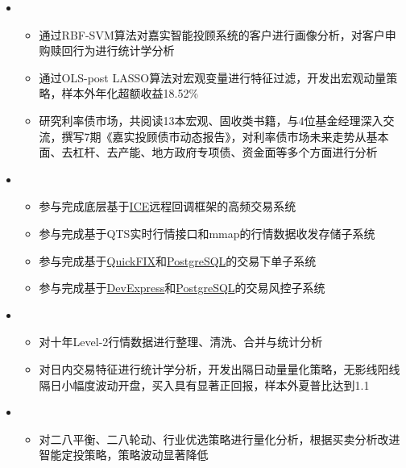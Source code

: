   \begin{itemize}[leftmargin=*]
    \item
      {\small
      \begin{itemize}
        \item 通过RBF-SVM算法对嘉实智能投顾系统的客户进行画像分析，对客户申购赎回行为进行统计学分析
        \item 通过OLS-post LASSO算法对宏观变量进行特征过滤，开发出宏观动量策略，样本外年化超额收益18.52\%
        \item 研究利率债市场，共阅读13本宏观、固收类书籍，与4位基金经理深入交流，撰写7期《嘉实投顾债市动态报告》，对利率债市场未来走势从基本面、去杠杆、去产能、地方政府专项债、资金面等多个方面进行分析
      \end{itemize}
      }
    \item
      {\small
      \begin{itemize}
        \item 参与完成底层基于\href{https://github.com/zeroc-ice/ice}{ICE}远程回调框架的高频交易系统
        \item 参与完成基于QTS实时行情接口和mmap的行情数据收发存储子系统
        \item 参与完成基于\href{https://github.com/quickfix/quickfix}{QuickFIX}和\href{https://www.postgresql.org/}{PostgreSQL}的交易下单子系统
        \item 参与完成基于\href{https://www.devexpress.com/}{DevExpress}和\href{https://www.postgresql.org/}{PostgreSQL}的交易风控子系统
      \end{itemize}
      }
    \item
      {\small
      \begin{itemize}
        \item 对十年Level-2行情数据进行整理、清洗、合并与统计分析
        \item 对日内交易特征进行统计学分析，开发出隔日动量量化策略，无影线阳线隔日小幅度波动开盘，买入具有显著正回报，样本外夏普比达到1.1
      \end{itemize}
      }
    \item
      {\small
      \begin{itemize}
        \item 对二八平衡、二八轮动、行业优选策略进行量化分析，根据买卖分析改进智能定投策略，策略波动显著降低

\end{itemize}}
\end{itemize}
